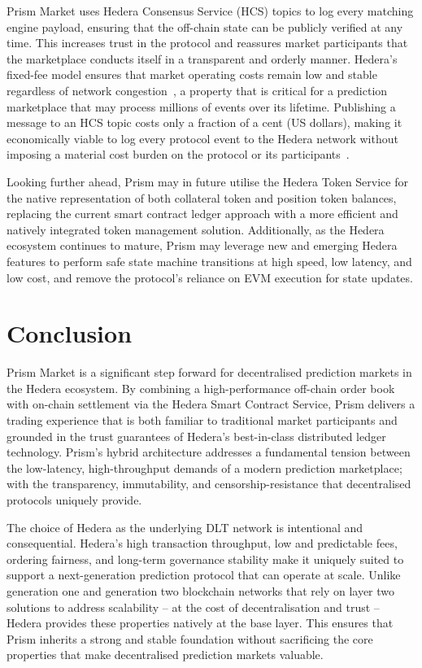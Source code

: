 \documentclass[11pt,a4paper]{article}
\begin{document}
Prism Market uses Hedera Consensus Service (HCS) topics to log every matching engine payload, ensuring that the off-chain state can be publicly verified at any time. This increases trust in the protocol and reassures market participants that the marketplace conducts itself in a transparent and orderly manner. Hedera's fixed-fee model ensures that market operating costs remain low and stable regardless of network congestion~\cite{hedera_whitepaper}, a property that is critical for a prediction marketplace that may process millions of events over its lifetime. Publishing a message to an HCS topic costs only a fraction of a cent (US dollars), making it economically viable to log every protocol event to the Hedera network without imposing a material cost burden on the protocol or its participants~\cite{hedera_hcs}.

Looking further ahead, Prism may in future utilise the Hedera Token Service for the native representation of both collateral token and position token balances, replacing the current smart contract ledger approach with a more efficient and natively integrated token management solution. Additionally, as the Hedera ecosystem continues to mature, Prism may leverage new and emerging Hedera features to perform safe state machine transitions at high speed, low latency, and low cost, and remove the protocol's reliance on EVM execution for state updates.



\section{Conclusion}

Prism Market is a significant step forward for decentralised prediction markets in the Hedera ecosystem. By combining a high-performance off-chain order book with on-chain settlement via the Hedera Smart Contract Service, Prism delivers a trading experience that is both familiar to traditional market participants and grounded in the trust guarantees of Hedera's best-in-class distributed ledger technology. Prism's hybrid architecture addresses a fundamental tension between the low-latency, high-throughput demands of a modern prediction marketplace; with the transparency, immutability, and censorship-resistance that decentralised protocols uniquely provide.

The choice of Hedera as the underlying DLT network is intentional and consequential. Hedera's high transaction throughput, low and predictable fees, ordering fairness, and long-term governance stability make it uniquely suited to support a next-generation prediction protocol that can operate at scale. Unlike generation one and generation two blockchain networks that rely on layer two solutions to address scalability -- at the cost of decentralisation and trust -- Hedera provides these properties natively at the base layer. This ensures that Prism inherits a strong and stable foundation without sacrificing the core properties that make decentralised prediction markets valuable.
\end{document}
